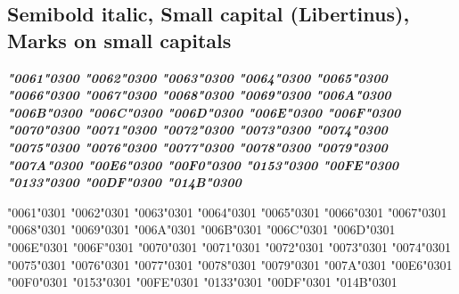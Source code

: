 \newpage
\subsection*{Semibold italic, Small capital (Libertinus), Marks on small capitals}

{\bfseries\itshape
\textsc{\char"0061\char"0300} \textsc{\char"0062\char"0300} \textsc{\char"0063\char"0300} \textsc{\char"0064\char"0300} \textsc{\char"0065\char"0300} \textsc{\char"0066\char"0300} \textsc{\char"0067\char"0300} \textsc{\char"0068\char"0300} \textsc{\char"0069\char"0300} \textsc{\char"006A\char"0300} \textsc{\char"006B\char"0300} \textsc{\char"006C\char"0300} \textsc{\char"006D\char"0300} \textsc{\char"006E\char"0300} \textsc{\char"006F\char"0300} \textsc{\char"0070\char"0300} \textsc{\char"0071\char"0300} \textsc{\char"0072\char"0300} \textsc{\char"0073\char"0300} \textsc{\char"0074\char"0300} \textsc{\char"0075\char"0300} \textsc{\char"0076\char"0300} \textsc{\char"0077\char"0300} \textsc{\char"0078\char"0300} \textsc{\char"0079\char"0300} \textsc{\char"007A\char"0300} \textsc{\char"00E6\char"0300} \textsc{\char"00F0\char"0300} \textsc{\char"0153\char"0300} \textsc{\char"00FE\char"0300} \textsc{\char"0133\char"0300} \textsc{\char"00DF\char"0300} \textsc{\char"014B\char"0300}

\textsc{\char"0061\char"0301} \textsc{\char"0062\char"0301} \textsc{\char"0063\char"0301} \textsc{\char"0064\char"0301} \textsc{\char"0065\char"0301} \textsc{\char"0066\char"0301} \textsc{\char"0067\char"0301} \textsc{\char"0068\char"0301} \textsc{\char"0069\char"0301} \textsc{\char"006A\char"0301} \textsc{\char"006B\char"0301} \textsc{\char"006C\char"0301} \textsc{\char"006D\char"0301} \textsc{\char"006E\char"0301} \textsc{\char"006F\char"0301} \textsc{\char"0070\char"0301} \textsc{\char"0071\char"0301} \textsc{\char"0072\char"0301} \textsc{\char"0073\char"0301} \textsc{\char"0074\char"0301} \textsc{\char"0075\char"0301} \textsc{\char"0076\char"0301} \textsc{\char"0077\char"0301} \textsc{\char"0078\char"0301} \textsc{\char"0079\char"0301} \textsc{\char"007A\char"0301} \textsc{\char"00E6\char"0301} \textsc{\char"00F0\char"0301} \textsc{\char"0153\char"0301} \textsc{\char"00FE\char"0301} \textsc{\char"0133\char"0301} \textsc{\char"00DF\char"0301} \textsc{\char"014B\char"0301}

}
